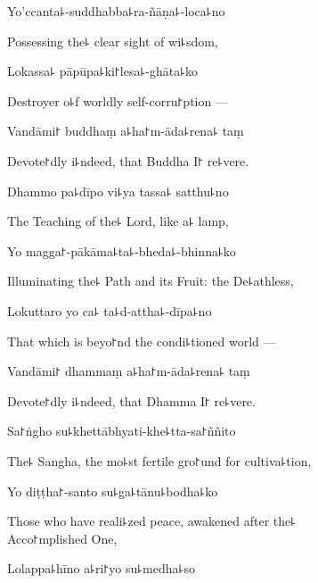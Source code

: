 Yo'ccanta꜕-suddhabba꜕ra-ñāṇa꜕-loca꜕no

\begin{english}
  Possessing the꜕ clear sight of wi꜕sdom,
\end{english}

Lokassa꜕ pāpūpa꜕ki꜓lesa꜕-ghāta꜕ko

\begin{english}
  Destroyer o꜕f worldly self-corru꜓ption ---
\end{english}

Vandāmi꜓ buddhaṃ a꜕ha꜓m-āda꜕rena꜕ taṃ

\begin{english}
  Devote꜓dly i꜕ndeed, that Buddha I꜓ re꜕vere.
\end{english}

Dhammo pa꜕dīpo vi꜕ya tassa꜕ satthu꜕no

\begin{english}
  The Teaching of the꜕ Lord, like a꜕ lamp,
\end{english}

Yo magga꜓-pākāma꜕ta꜕-bheda꜕-bhinna꜕ko

\begin{english}
  Illuminating the꜕ Path and its Fruit: the De꜕athless,
\end{english}

Lokuttaro yo ca꜕ ta꜕d-attha꜕-dīpa꜕no

\begin{english}
  That which is beyo꜓nd the condi꜕tioned world ---
\end{english}

Vandāmi꜓ dhammaṃ a꜕ha꜓m-āda꜕rena꜕ taṃ

\begin{english}
  Devote꜓dly i꜕ndeed, that Dhamma I꜓ re꜕vere.
\end{english}

Sa꜓ṅgho su꜕khettābhyati-khe꜕tta-sa꜓ññito

\begin{english}
  The꜕ Sangha, the mo꜕st fertile gro꜓und for cultiva꜕tion,
\end{english}

Yo diṭṭha꜓-santo su꜕ga꜕tānu꜕bodha꜕ko

\begin{english}
  Those who have reali꜕zed peace, awakened after the꜕ \\Acco꜓mplished One,
\end{english}

Lolappa꜕hīno a꜕ri꜓yo su꜕medha꜕so


